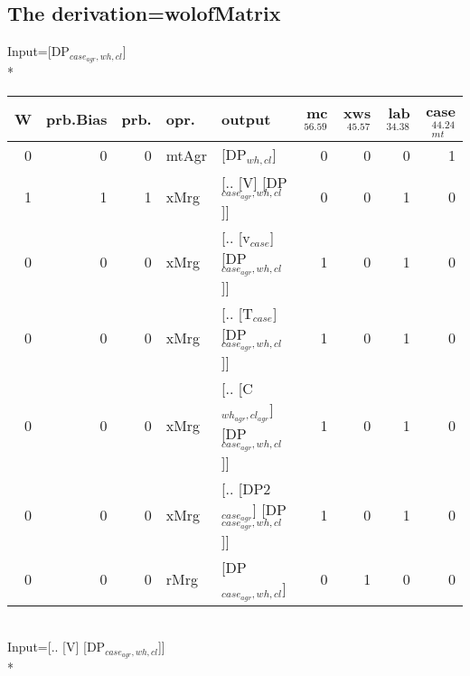 \subsection{The derivation=wolofMatrix}
\begingroup\scriptsize Input=[DP$_{case_{agr},wh,cl}$]\\*
\begin{tabularx}{\linewidth}{rrrlXrrrr}
\hline
   W &   prb.Bias &   prb. & opr.    & output                                     &   mc$^{56.59}$ &   xws$^{45.57}$ &   lab$^{34.38}$ &   case$_{mt}^{44.24}$ \\
\hline
   0 &       0 &   0 & mtAgr & [DP$_{wh,cl}$]                                 &            0 &             0 &             0 &                 1 \\
   1 &       1 &   1 & xMrg  & [.. [V] [DP$_{case_{agr},wh,cl}$]]               &            0 &             0 &             1 &                 0 \\
   0 &       0 &   0 & xMrg  & [.. [v$_{case}$] [DP$_{case_{agr},wh,cl}$]]          &            1 &             0 &             1 &                 0 \\
   0 &       0 &   0 & xMrg  & [.. [T$_{case}$] [DP$_{case_{agr},wh,cl}$]]          &            1 &             0 &             1 &                 0 \\
   0 &       0 &   0 & xMrg  & [.. [C$_{wh_{agr},cl_{agr}}$] [DP$_{case_{agr},wh,cl}$]] &            1 &             0 &             1 &                 0 \\
   0 &       0 &   0 & xMrg  & [.. [DP2$_{case_{agr}}$] [DP$_{case_{agr},wh,cl}$]]    &            1 &             0 &             1 &                 0 \\
   0 &       0 &   0 & rMrg  & [DP$_{case_{agr},wh,cl}$]                        &            0 &             1 &             0 &                 0 \\
\hline
\end{tabularx}\endgroup\\
\begingroup\scriptsize Input=[.. [V] [DP$_{case_{agr},wh,cl}$]]\\*
